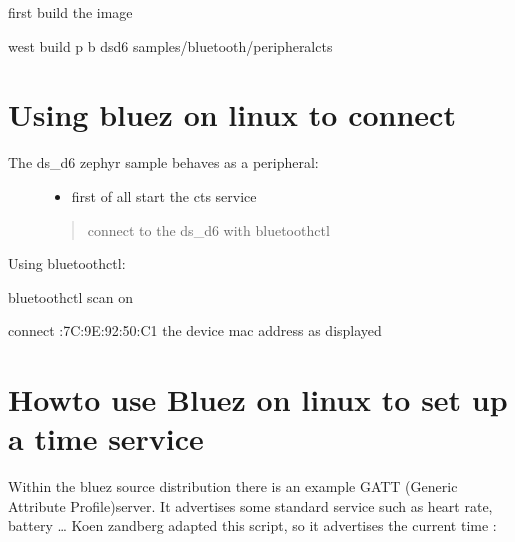 \documentclass[letterpaper,10pt,english]{sphinxmanual}
\begin{document}
first build the image

\begin{sphinxVerbatim}[commandchars=\\\{\}]
  west build \PYGZhy{}p \PYGZhy{}b ds\PYGZus{}d6 samples/bluetooth/peripheral\PYGZhy{}cts
\end{sphinxVerbatim}


\section{Using bluez on linux to connect}
\label{\detokenize{current-time:using-bluez-on-linux-to-connect}}\begin{description}
\item[{The ds\_d6 zephyr sample behaves as a peripheral:}] \leavevmode\begin{itemize}
\item {} 
first of all start the cts service

\end{itemize}
\begin{quote}

\sphinxhyphen{}connect to the ds\_d6 with bluetoothctl
\end{quote}

\end{description}

Using bluetoothctl:

\begin{sphinxVerbatim}[commandchars=\\\{\}]
bluetoothctl
scan on


connect :7C:9E:92:50:C1 the device mac address as displayed
\end{sphinxVerbatim}


\section{Howto use Bluez on linux to set up a time service}
\label{\detokenize{current-time:howto-use-bluez-on-linux-to-set-up-a-time-service}}
Within the bluez source distribution there is an example GATT (Generic Attribute Profile)server. It advertises some standard service such as heart rate, battery …
Koen zandberg adapted this script, so it advertises the current time :
\end{document}
